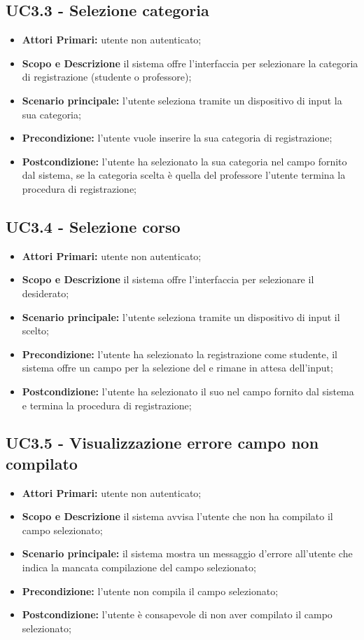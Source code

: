 \documentclass[AnalisiDeiRequisiti.tex]{subfiles}
\begin{document}
\subsection{UC3.3 - Selezione categoria}
\begin{itemize}
	\item \textbf{Attori Primari:} utente non autenticato;
	\item \textbf{Scopo e Descrizione} il sistema offre l'interfaccia per selezionare la categoria di registrazione (studente o professore);
	\item \textbf{Scenario principale:} l'utente seleziona tramite un dispositivo di input la sua categoria;
	\item \textbf{Precondizione:} l'utente vuole inserire la sua categoria di registrazione;
	\item \textbf{Postcondizione:} l'utente ha selezionato la sua categoria nel campo fornito dal sistema, se la categoria scelta è quella del professore l'utente termina la procedura di registrazione;
\end{itemize}
\subsection{UC3.4 - Selezione corso}
\begin{itemize}
	\item \textbf{Attori Primari:} utente non autenticato;
	\item \textbf{Scopo e Descrizione} il sistema offre l'interfaccia per selezionare il  desiderato;
	\item \textbf{Scenario principale:} l'utente seleziona tramite un dispositivo di input il  scelto;
	\item \textbf{Precondizione:} l'utente ha selezionato la registrazione come studente, il sistema offre un campo per la selezione del  e rimane in attesa dell'input;
	\item \textbf{Postcondizione:} l'utente ha selezionato il suo  nel campo fornito dal sistema e termina la procedura di registrazione;
\end{itemize}
\subsection{UC3.5 - Visualizzazione errore campo non compilato}
\begin{itemize}
	\item \textbf{Attori Primari:} utente non autenticato;
	\item \textbf{Scopo e Descrizione} il sistema avvisa l'utente che non ha compilato il campo selezionato;
	\item \textbf{Scenario principale:} il sistema mostra un messaggio d'errore all'utente che indica la mancata compilazione del campo selezionato;
	\item \textbf{Precondizione:} l'utente non compila il campo selezionato;
	\item \textbf{Postcondizione:} l'utente è consapevole di non aver compilato il campo selezionato;
\end{itemize}
\end{document}
